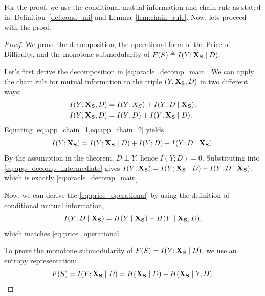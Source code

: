 \documentclass{article}
\theoremstyle{plain}
\theoremstyle{definition}
\theoremstyle{remark}
\begin{document}
For the proof, we use the conditional mutual information and chain rule as stated in: Definition~\ref{def:cond_mi} and Lemma~\ref{lem:chain_rule}. Now, lets proceed with the proof.
\begin{proof}
We prove the decomposition, the operational form of the Price of Difficulty, and the monotone submodularity of
\(
F(S)\triangleq I(Y;{\bf X_S}\mid D).
\)

Let's first derive the decomposition in \cref{eq:oracle_decomp_main}.
We can apply the chain rule for mutual information to the triple $(Y,{\bf X_S},D)$ in two different ways:
\begin{align}
\label{eq:app_chain_1}
I(Y;{\bf X_S},D) &= I(Y;X_S) + I(Y;D\mid {\bf X_S}),\\
\label{eq:app_chain_2}
I(Y;{\bf X_S},D) &= I(Y;D) + I(Y;{\bf X_S}\mid D).
\end{align}
Equating \cref{eq:app_chain_1,eq:app_chain_2} yields
\begin{equation}
\label{eq:app_decomp_intermediate}
I(Y;{\bf X_S})= I(Y;{\bf X_S}\mid D) + I(Y;D) - I(Y;D\mid {\bf X_S}).
\end{equation}
By the assumption in the theorem, $D\perp Y$, hence $I(Y;D)=0$. Substituting into \cref{eq:app_decomp_intermediate} gives
\(
I(Y;{\bf X_S})= I(Y;{\bf X_S}\mid D) - I(Y;D\mid {\bf X_S}),
\)
which is exactly \cref{eq:oracle_decomp_main}.

Now, we can derive the \cref{eq:price_operational} by using the definition of conditional mutual information,
\begin{equation}
\label{eq:app_price_operational}
I(Y;D\mid {\bf X_S})=H(Y\mid {\bf X_S})-H(Y\mid {\bf X_S},D),
\end{equation}
which matches \cref{eq:price_operational}.

To prove the monotone submodularity of $F(S)=I(Y;{\bf X_S}\mid D)$,
we use an entropy representation:
\begin{equation}
\label{eq:app_F_entropy_form}
F(S)=I(Y;{\bf X_S}\mid D)=H({\bf X_S}\mid D)-H({\bf X_S}\mid Y,D).
\end{equation}


\end{proof}
\end{document}
